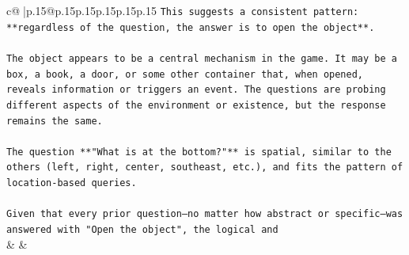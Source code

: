 \documentclass{article}
\begin{document}
{\begin{supertabular}{c@{$\;$}|p{.15\linewidth}@{}p{.15\linewidth}p{.15\linewidth}p{.15\linewidth}p{.15\linewidth}p{.15\linewidth}}
{{{\texttt{This suggests a consistent pattern: **regardless of the question, the answer is to open the object**.} \\
\\ 
\texttt{The object appears to be a central mechanism in the game. It may be a box, a book, a door, or some other container that, when opened, reveals information or triggers an event. The questions are probing different aspects of the environment or existence, but the response remains the same.} \\
\\ 
\texttt{The question **"What is at the bottom?"** is spatial, similar to the others (left, right, center, southeast, etc.), and fits the pattern of location{-}based queries.} \\
\\ 
\texttt{Given that every prior question—no matter how abstract or specific—was answered with "Open the object", the logical and} \\
            }
        }
    }
    & & \\ \\


\end{supertabular}}
\end{document}
